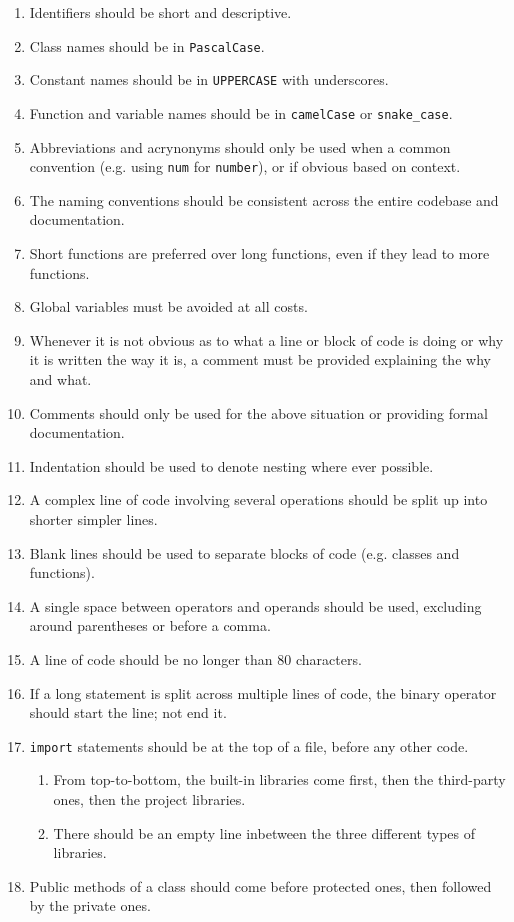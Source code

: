 \documentclass[11pt]{article}
\begin{document}
\begin{enumerate}
    \item Identifiers should be short and descriptive.
    \item Class names should be in \texttt{PascalCase}.
    \item Constant names should be in \texttt{UPPERCASE} with underscores.
    \item Function and variable names should be in \texttt{camelCase} or \texttt{snake_case}.
    \item Abbreviations and acrynonyms should only be used when a common convention (e.g. using \texttt{num} for \texttt{number}), or if obvious based on context.
    \item The naming conventions should be consistent across the entire codebase and documentation.
    \item Short functions are preferred over long functions, even if they lead to more functions.
    \item Global variables must be avoided at all costs.
    \item Whenever it is not obvious as to what a line or block of code is doing or why it is written the way it is, a comment must be provided explaining the why and what.
    \item Comments should only be used for the above situation or providing formal documentation.
    \item Indentation should be used to denote nesting where ever possible.
    \item A complex line of code involving several operations should be split up into shorter simpler lines.
    \item Blank lines should be used to separate blocks of code (e.g. classes and functions).
    \item A single space between operators and operands should be used, excluding around parentheses or before a comma.
    \item A line of code should be no longer than 80 characters.
    \item If a long statement is split across multiple lines of code, the binary operator should start the line; not end it.
    \item \texttt{import} statements should be at the top of a file, before any other code.
    \begin{enumerate}
        \item From top-to-bottom, the built-in libraries come first, then the third-party ones, then the project libraries.
        \item There should be an empty line inbetween the three different types of libraries.
    \end{enumerate}
    \item Public methods of a \gls{class} should come before protected ones, then followed by the private ones.
\end{enumerate}
\end{document}
